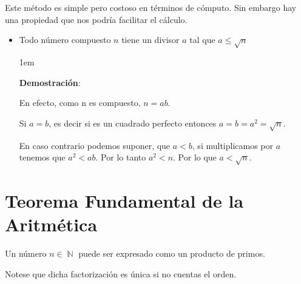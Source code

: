 \documentclass[12pt]{report}                                    %
\newenvironment{SmallIndentation}[1][0.75em]                    %
    {\begin{adjustwidth}{#1}{}\begin{footnotesize}}                 %
    {\end{footnotesize}\end{adjustwidth}}                           %
\DeclareMathOperator \Naturals  {\mathbb{N}}                     %
\begin{document}
            Este método es simple pero costoso en términos de cómputo. Sin
            embargo hay una propiedad que nos podría facilitar el cálculo.

            \begin{itemize}

                \item Todo número compuesto $n$ tiene un divisor $a$ tal que
                    $a \leq \sqrt{n}$

                    \begin{SmallIndentation}[1em]
                        \textbf{Demostración}:

                        En efecto, como n es compuesto, $n = ab$.

                        Si $a = b$, es decir si es un cuadrado perfecto entonces
                        $a = b = a^2 = \sqrt{n}$.

                        En caso contrario podemos suponer, que $a<b$, si multiplicamos
                        por $a$ tenemos que $a^2<ab$. Por lo tanto $a^2 < n$.
                        Por lo que $a < \sqrt{n}$.

                    \end{SmallIndentation}

                \end{itemize}



    \clearpage
    \section{Teorema Fundamental de la Aritmética}

        Un número $n \in \Naturals$ puede ser expresado como
        un producto de primos.

        Notese que dicha factorización es única si no cuentas el 
        orden.
\end{document}
